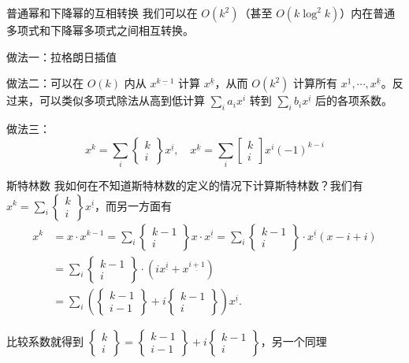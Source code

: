 \begin{frame}{普通幂和下降幂的互相转换}
    我们可以在 $O(k^2)$（甚至 $O(k\log^2 k)$）内在普通多项式和下降幂多项式之间相互转换。

    做法一：拉格朗日插值

    做法二：可以在 $O(k)$ 内从 $x^{\underline{k-1}}$ 计算 $x^{\underline{k}}$，从而 $O(k^2)$ 计算所有 $x^{\underline{1}},\cdots,x^{\underline{k}}$。反过来，可以类似多项式除法从高到低计算 $\sum_{i}a_ix^i$ 转到 $\sum_i b_ix^{\underline{i}}$ 后的各项系数。

    做法三：
    $$
    x^k=\sum_i \begin{Bmatrix}k\\i\end{Bmatrix}x^{\underline{i}},\quad x^{\underline{k}}=\sum_i\begin{bmatrix}k\\i\end{bmatrix}x^i(-1)^{k-i}
    $$
\end{frame}
\begin{frame}{斯特林数}
    我如何在不知道斯特林数的定义的情况下计算斯特林数？我们有 $\displaystyle  x^k=\sum_i \begin{Bmatrix}k\\i\end{Bmatrix}x^{\underline{i}}$，而另一方面有
    $$
    \begin{aligned}
    x^k&=x\cdot x^{k-1}=\sum_i\begin{Bmatrix}k-1\\i\end{Bmatrix}x\cdot x^{\underline{i}}=\sum_i\begin{Bmatrix}k-1\\i\end{Bmatrix}\cdot x^{\underline{i}}(x-i+i)\\
    &=\sum_i\begin{Bmatrix}k-1\\i\end{Bmatrix}\cdot (ix^{\underline{i}}+x^{\underline{i+1}})\\
    &=\sum_i\left(\begin{Bmatrix}k-1\\i-1\end{Bmatrix}+i\begin{Bmatrix}k-1\\i\end{Bmatrix}\right)x^{\underline{i}}.
    \end{aligned}
    $$

    比较系数就得到 $\displaystyle\begin{Bmatrix}k\\i\end{Bmatrix}=\begin{Bmatrix}k-1\\i-1\end{Bmatrix}+i\begin{Bmatrix}k-1\\i\end{Bmatrix}$，另一个同理
\end{frame}
